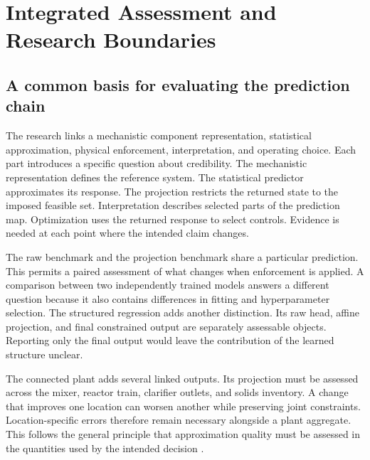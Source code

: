 \chapter{Integrated Assessment and Research Boundaries}
\label{ch:assessment}

\section{A common basis for evaluating the prediction chain}

The research links a mechanistic component representation, statistical approximation, physical enforcement, interpretation, and operating choice. Each part introduces a specific question about credibility. The mechanistic representation defines the reference system. The statistical predictor approximates its response. The projection restricts the returned state to the imposed feasible set. Interpretation describes selected parts of the prediction map. Optimization uses the returned response to select controls. Evidence is needed at each point where the intended claim changes.

The raw benchmark and the projection benchmark share a particular prediction. This permits a paired assessment of what changes when enforcement is applied. A comparison between two independently trained models answers a different question because it also contains differences in fitting and hyperparameter selection. The structured regression adds another distinction. Its raw head, affine projection, and final constrained output are separately assessable objects. Reporting only the final output would leave the contribution of the learned structure unclear.

The connected plant adds several linked outputs. Its projection must be assessed across the mixer, reactor train, clarifier outlets, and solids inventory. A change that improves one location can worsen another while preserving joint constraints. Location-specific errors therefore remain necessary alongside a plant aggregate. This follows the general principle that approximation quality must be assessed in the quantities used by the intended decision \citep{BhosekarIerapetritou2018,McBride2019}.

